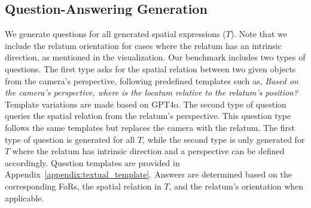 \subsection{Question-Answering Generation}\label{sec:QA_generation}
We generate questions for all generated spatial expressions ($T$). 
Note that we include the relatum orientation for cases where the relatum has an intrinsic direction, as mentioned in the visualization.
Our benchmark includes two types of questions. 
The first type asks for the spatial relation between two given objects from the camera's perspective, following predefined templates such as, \textit{Based on the camera’s perspective, where is the {locatum} relative to the {relatum}’s position?}
Template variations are made based on GPT4o.
The second type of question queries the spatial relation from the relatum’s perspective. 
This question type follows the same templates but replaces the camera with the relatum.
The first type of question is generated for all $T$, while the second type is only generated for $T$ where the relatum has intrinsic direction and a perspective can be defined accordingly.
Question templates are provided in Appendix~\ref{appendix:textual_template}. 
Answers are determined based on the corresponding FoRs, the spatial relation in $T$, and the relatum’s orientation when applicable.
